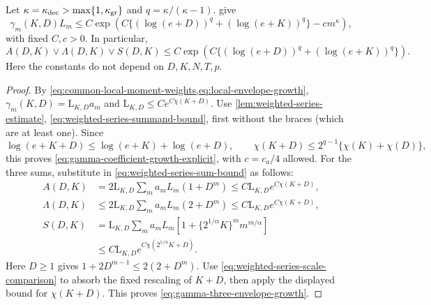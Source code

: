 \begin{lemma}
\label{lemma-concrete-bound-A-Lambda}
Let $\kappa=\kappa_{\rm dec}>\max\{1,\kappa_{\rm gr}\}$ and
$q=\kappa/(\kappa-1)$.   give
\begin{equation}
\label{eq:gamma-coefficient-growth-explicit}
 \gamma_m(K,D)L_m\le
 C\exp\left(C\{(\log(e+D))^q+(\log(e+K))^q\}-c m^\kappa\right),
\end{equation}
with fixed $C,c>0$.  In particular,
\begin{equation}
\label{eq:gamma-three-envelope-growth}
 A(D,K)\vee\Lambda(D,K)\vee S(D,K)
 \le C\exp\left(C\{(\log(e+D))^q+(\log(e+K))^q\}\right).
\end{equation}
Here the constants do not depend on $D,K,N,T,p$.
\end{lemma}
\begin{proof}
By \cref{eq:common-local-moment-weights,eq:local-envelope-growth},
$\gamma_m(K,D)=\mathrm L_{K,D}a_m$ and
$\mathrm L_{K,D}\le Ce^{C\chi(K+D)}$.
Use \cref{lem:weighted-series-estimate},
\eqref{eq:weighted-series-summand-bound}, first without the braces
(which are at least one). Since
\[
 \log(e+K+D)\le\log(e+K)+\log(e+D),\qquad
 \chi(K+D)\le2^{q-1}\{\chi(K)+\chi(D)\},
\]
this proves \eqref{eq:gamma-coefficient-growth-explicit}, with
$c=c_a/4$ allowed. For the three sums, substitute in
\eqref{eq:weighted-series-sum-bound} as follows:
\[
\begin{aligned}
 A(D,K)&=2\mathrm L_{K,D}\sum_m a_mL_m(1+D^m)
              \le C\mathrm L_{K,D}e^{C\chi(K+D)},\\
 \Lambda(D,K)&\le2\mathrm L_{K,D}\sum_m a_mL_m(2+D^m)
              \le C\mathrm L_{K,D}e^{C\chi(K+D)},\\
 S(D,K)&=\mathrm L_{K,D}\sum_m a_mL_m
                 [1+\{2^{1/\alpha}K\}^m m^{m/\alpha}]\\
 &\le C\mathrm L_{K,D}e^{C\chi(2^{1/\alpha}K+D)}.
\end{aligned}
\]
Here $D\ge1$ gives $1+2D^{m-1}\le2(2+D^m)$.
Use \eqref{eq:weighted-series-scale-comparison} to absorb the fixed
rescaling of $K+D$, then apply the displayed bound for $\chi(K+D)$.
This proves \eqref{eq:gamma-three-envelope-growth}.
\end{proof}

